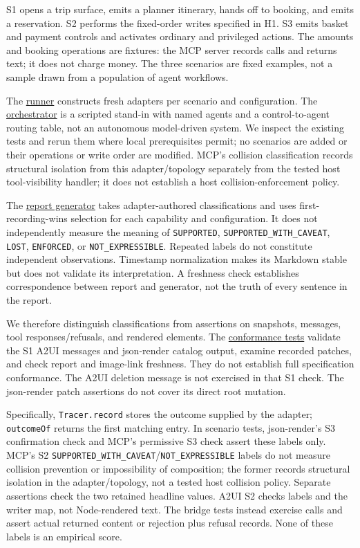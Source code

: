 \documentclass[11pt]{article}
\begin{document}
S1 opens a trip surface, emits a planner itinerary, hands off to
booking, and emits a reservation. S2 performs the fixed-order writes
specified in H1. S3 emits basket and payment controls and activates
ordinary and privileged actions. The amounts and booking operations are
fixtures: the MCP server records calls and returns text; it does not
charge money. The three scenarios are fixed examples, not a sample drawn
from a population of agent workflows.

The \href{../src/scenarios/run.ts}{runner} constructs fresh adapters per
scenario and configuration. The
\href{../src/orchestrator/orchestrator.ts}{orchestrator} is a scripted
stand-in with named agents and a control-to-agent routing table, not an
autonomous model-driven system. We inspect the existing tests and rerun
them where local prerequisites permit; no scenarios are added or their
operations or write order are modified. MCP's collision classification
records structural isolation from this adapter/topology separately from
the tested host tool-visibility handler; it does not establish a host
collision-enforcement policy.

The \href{../src/report/generate.ts}{report generator} takes
adapter-authored classifications and uses first-recording-wins selection
for each capability and configuration. It does not independently measure
the meaning of \texttt{SUPPORTED}, \texttt{SUPPORTED\_WITH\_CAVEAT},
\texttt{LOST}, \texttt{ENFORCED}, or \texttt{NOT\_EXPRESSIBLE}. Repeated
labels do not constitute independent observations. Timestamp
normalization makes its Markdown stable but does not validate its
interpretation. A freshness check establishes correspondence between
report and generator, not the truth of every sentence in the report.

We therefore distinguish classifications from assertions on snapshots,
messages, tool responses/refusals, and rendered elements. The
\href{../tests/protocol/conformance.test.ts}{conformance tests} validate
the S1 A2UI messages and json-render catalog output, examine recorded
patches, and check report and image-link freshness. They do not
establish full specification conformance. The A2UI deletion message is
not exercised in that S1 check. The json-render patch assertions do not
cover its direct root mutation.

Specifically, \texttt{Tracer.record} stores the outcome supplied by the
adapter; \texttt{outcomeOf} returns the first matching entry. In
scenario tests, json-render's S3 confirmation check and MCP's permissive
S3 check assert these labels only. MCP's S2
\texttt{SUPPORTED\_WITH\_CAVEAT}/\texttt{NOT\_EXPRESSIBLE} labels do not
measure collision prevention or impossibility of composition; the former
records structural isolation in the adapter/topology, not a tested host
collision policy. Separate assertions check the two retained headline
values. A2UI S2 checks labels and the writer map, not Node-rendered
text. The bridge tests instead exercise calls and assert actual returned
content or rejection plus refusal records. None of these labels is an
empirical score.
\end{document}
